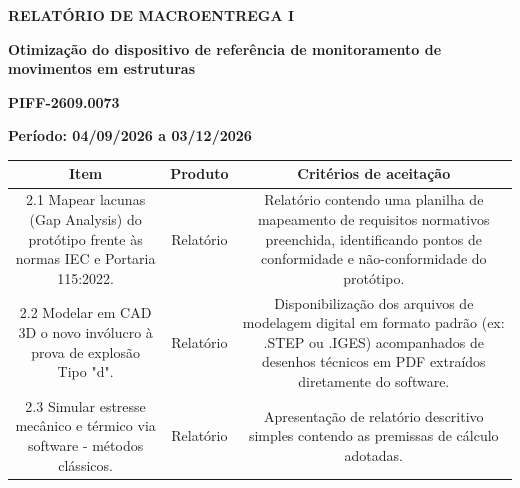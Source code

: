 \begin{center}
    \LARGE
    \textbf{RELATÓRIO DE MACROENTREGA I}

    \vspace{0.6cm}
    \normalsize

    \begin{minipage}{.90\linewidth}
        \centering
        \textbf{
            Otimização do dispositivo de referência de
monitoramento de movimentos em estruturas
        }
    
        \vspace{.6cm}
        \textbf{PIFF-2609.0073}
        \normalsize
    \end{minipage}
    
    \vspace{1.2cm}
    
    \begin{flushleft}
     \phantom{a.}\textbf{Período: 04/09/2026 a 03/12/2026}
    \end{flushleft}
    
    \begin{center}
    \small
    \begin{tabular}{|c|c|c|}
    \hline
        Item & Produto & Critérios de aceitação \\
    \hline
        \multicolumn{1}{|m{5cm}|}{
            2.1 Mapear lacunas (Gap Analysis) do protótipo
frente às normas IEC e Portaria 115:2022.
        } 
        & \multicolumn{1}{m{3.5cm}|}{
            \centering
            Relatório
        } 
        & \multicolumn{1}{m{6.5cm}|}{
            Relatório contendo uma
planilha de mapeamento de
requisitos normativos
preenchida, identificando
pontos de conformidade e
não-conformidade do
protótipo.

        }\\
    \hline
        \multicolumn{1}{|m{5cm}|}{
            2.2 Modelar em CAD 3D o novo invólucro à
prova de explosão Tipo "d".
        } 
        & \multicolumn{1}{m{3.5cm}|}{
            \centering
            Relatório
        } 
        & \multicolumn{1}{m{6.5cm}|}{
            Disponibilização dos arquivos
de modelagem digital em
formato padrão (ex: .STEP ou
.IGES) acompanhados de desenhos técnicos em PDF
extraídos diretamente do
software.

        }\\
    \hline
        \multicolumn{1}{|m{5cm}|}{
            2.3 Simular estresse mecânico e térmico via
software - métodos clássicos.
        } 
        & \multicolumn{1}{m{3.5cm}|}{
            \centering
            Relatório
        } 
        & \multicolumn{1}{m{6.5cm}|}{
            Apresentação de relatório
descritivo simples contendo as
premissas de cálculo adotadas.

}
\end{tabular}
\end{center}
\end{center}
